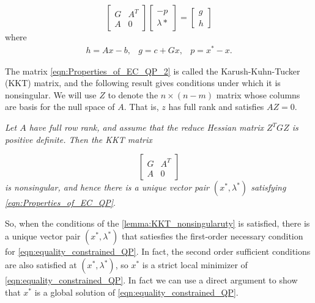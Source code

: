 \begin{equation}
\begin{bmatrix}
  	G & A^T \\
    A & 0
  \end{bmatrix}
  \begin{bmatrix}
  	-p \\
    \lambda{*}
  \end{bmatrix}
  =
  \begin{bmatrix}
  	g \\
    h
  \end{bmatrix}	
  \label{eqn:Properties_of_EC_QP_2}
\end{equation}
where
\begin{equation}
\begin{aligned}
h= Ax-b, & g = c+Gx, & p = x^* - x.
\end{aligned}
\label{eqn:Properties_of_EC_QP_3}	
\end{equation}

The matrix \ref{eqn:Properties_of_EC_QP_2} is called the Karush-Kuhn-Tucker (KKT) matrix, and the following result gives conditions under which it is nonsingular. We will use $Z$ to denote the $n \times (n-m)$ matrix whose columns are basis for the null space of $A$. That is, $z$ has full  rank and satisfies $AZ=0$.


\begin{lemma}
\textit{Let $A$ have full row rank, and assume that the reduce Hessian matrix $Z^TGZ$ is positive definite. Then the KKT matrix}

\begin{equation}
	\begin{bmatrix}
  		G & A^T \\
    	A & 0
    \end{bmatrix}
\label{eqn:Properties_of_EC_QP_4}	
\end{equation}
\textit{is nonsingular, and hence there is a unique vector pair $(x^*, \lambda^*)$ satisfying \ref{eqn:Properties_of_EC_QP}}.	
\label{lemma:KKT_nonsingularuty}
\end{lemma}

So, when the conditions of the \ref{lemma:KKT_nonsingularuty} is satisfied, there is a unique vector pair $(x^*, \lambda^*)$ that satiesfies the first-order necessary condition for \ref{eqn:equality_constrained_QP}. In fact, the second order sufficient conditions are also satisfied at $(x^*, \lambda^*)$, so $x^*$ is a strict local minimizer of \ref{eqn:equality_constrained_QP}. In fact we can use a direct argument to show that $x^*$ is a global solution of \ref{eqn:equality_constrained_QP}.


